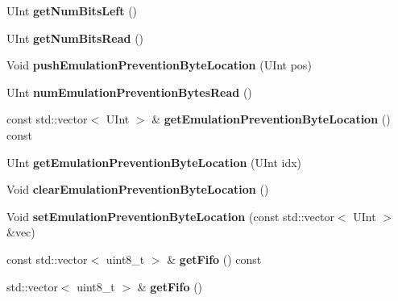 \begin{DoxyCompactItemize}
\item 
\mbox{\label{class_t_com_input_bitstream_ad4d126328cbf4a46ecd85f249641d997}} 
U\+Int {\bfseries get\+Num\+Bits\+Left} ()
\item 
\mbox{\label{class_t_com_input_bitstream_a5d57d5cc7f511cb0b9a55d41d00d3b9a}} 
U\+Int {\bfseries get\+Num\+Bits\+Read} ()
\item 
\mbox{\label{class_t_com_input_bitstream_abff1646904759f347ed3dc1e0cc53a2d}} 
Void {\bfseries push\+Emulation\+Prevention\+Byte\+Location} (U\+Int pos)
\item 
\mbox{\label{class_t_com_input_bitstream_a6acbeac2976520701c1482c429c92c62}} 
U\+Int {\bfseries num\+Emulation\+Prevention\+Bytes\+Read} ()
\item 
\mbox{\label{class_t_com_input_bitstream_ade5ce9df9e23ab040a654ac3fa060f20}} 
const std\+::vector$<$ U\+Int $>$ \& {\bfseries get\+Emulation\+Prevention\+Byte\+Location} () const
\item 
\mbox{\label{class_t_com_input_bitstream_a3fd49adf853f9f79d51a519e5178752a}} 
U\+Int {\bfseries get\+Emulation\+Prevention\+Byte\+Location} (U\+Int idx)
\item 
\mbox{\label{class_t_com_input_bitstream_a25aed1b01bd7d194fb20b9f6b212e51d}} 
Void {\bfseries clear\+Emulation\+Prevention\+Byte\+Location} ()
\item 
\mbox{\label{class_t_com_input_bitstream_a7d8e320872585390739c153b0dc5b6ad}} 
Void {\bfseries set\+Emulation\+Prevention\+Byte\+Location} (const std\+::vector$<$ U\+Int $>$ \&vec)
\item 
\mbox{\label{class_t_com_input_bitstream_a431c4d7400c2c1e188659ad484855af0}} 
const std\+::vector$<$ uint8\+\_\+t $>$ \& {\bfseries get\+Fifo} () const
\item 
\mbox{\label{class_t_com_input_bitstream_afd0be844c598fe87ee6a3cc7004a0e8f}} 
std\+::vector$<$ uint8\+\_\+t $>$ \& {\bfseries get\+Fifo} ()
\end{DoxyCompactItemize}
